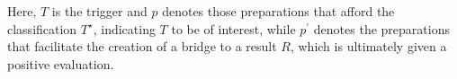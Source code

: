 Here, $T$ is the trigger and $p$ denotes those preparations that afford the
classification $T^\star$, indicating $T$ to be of interest, while
$p^{\prime}$ denotes the preparations that facilitate the creation of a
bridge to a result $R$, which is ultimately given a positive
evaluation.
